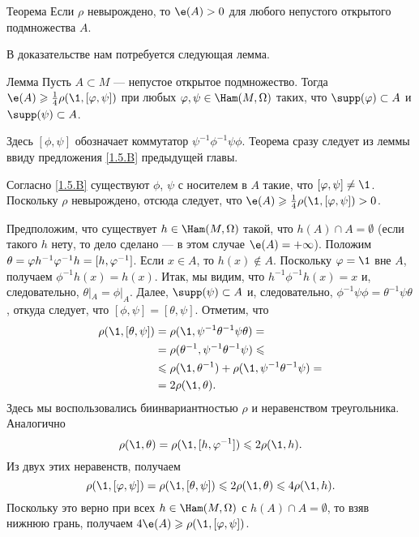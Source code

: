 \begin{thm}[(\cite{EP})]{Теорема}\label{2.4.A}
Если $\rho$ невырождено, то $\e (A)> 0$ для любого непустого открытого подмножества $A$.
\end{thm}

В доказательстве нам потребуется следующая лемма.

\begin{thm}{Лемма}\label{2.4.B}
Пусть $A \subset M$ --- непустое открытое подмножество.
Тогда $\e (A) \ge \tfrac14 \rho (\1, [\phi, \psi])$ при любых $\phi, \psi \in \Ham (M, \Omega)$ таких, что $\supp (\phi) \subset A$ и $\supp (\psi) \subset A$.
\end{thm}

Здесь $[\phi, \psi]$ обозначает коммутатор $\psi^{-1} \phi^{-1} \psi\phi$.
Теорема сразу следует из леммы ввиду предложения \ref{1.5.B} предыдущей главы.

Согласно \ref{1.5.B} существуют $\phi$, $\psi$ с носителем в $A$ такие, что $[\phi, \psi] \ne \1$.
Поскольку $\rho$ невырождено, отсюда следует, что $\e (A) \ge \tfrac14 \rho (\1, [\phi, \psi])> 0$.
\qeds

Предположим, что существует $h \in \Ham (M, \Omega)$ такой, что $h (A) \cap A = \emptyset$ (если такого $h$ нету, то дело сделано --- в этом случае $\e (A) = + \infty$).
Положим $\theta = \phi h^{-1} \phi^{-1} h \z= [h, \phi^{-1}]$.
Если $x \in A$, то $h (x) \notin A$.
Поскольку $\phi = \1$ вне $A$, получаем $\phi^{-1} h (x) = h (x)$.
Итак, мы видим, что $h^{-1} \phi^{-1} h (x) = x$ и, следовательно, $\theta|_A = \phi|_A$.
Далее, $\supp (\psi) \subset A$ и, следовательно, $\phi^{-1} \psi\phi = \theta^{-1} \psi\theta$, откуда следует, что $[\phi, \psi] = [\theta, \psi]$.
Отметим, что 
\begin{align*}
\rho (\1, [\theta, \psi]) &= \rho (\1, \psi^{-1} \theta^{-1} \psi\theta) =
\\
&=\rho (\theta^{-1}, \psi^{-1} \theta^{-1} \psi) \le
\\
&\le \rho (\1, \theta^{-1}) + \rho (\1, \psi^{-1} \theta^{-1} \psi) =
\\
&= 2\rho (\1, \theta).
\end{align*}
Здесь мы воспользовались биинвариантностью $\rho$ и неравенством треугольника.
Аналогично 
\[\rho (\1, \theta) = \rho (\1, [h, \phi^{-1}]) \le 2\rho (\1, h).\]
Из двух этих неравенств, получаем 
\[\rho (\1, [\phi, \psi]) = \rho (\1, [\theta, \psi]) \le 2\rho (\1, \theta) \le 4\rho (\1, h).\]
Поскольку это верно при всех $h \in \Ham (M, \Omega)$ с $h (A) \cap A =\emptyset$, то взяв нижнюю грань, получаем $4\e (A) \ge \rho (\1, [\phi, \psi])$.
\qeds

